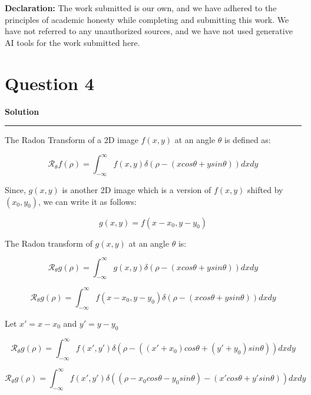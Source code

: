 \documentclass[a4paper,12pt]{article}
\title{\cooltitle{CS754 Assignment-3}}
\author{{\bf Saksham Rathi, Ekansh Ravi Shankar, Kshitij Vaidya}}
\date{}
\newenvironment{solution}[2][]{%
    \begin{mdframed}[linecolor=blue!70!black, linewidth=2pt, roundcorner=10pt, backgroundcolor=yellow!10!white, skipabove=12pt, skipbelow=12pt]%
        \textbf{\large #2}
        \par\noindent\rule{\textwidth}{0.4pt}
}{
    \end{mdframed}
}
\begin{document}
\maketitle
\textbf{Declaration:} The work submitted is our own, and
we have adhered to the principles of academic honesty while completing and submitting this work. We have not referred to any unauthorized sources, and we have not used generative AI tools for the work submitted here.

\section*{Question 4}

\begin{solution}{Solution}
 The Radon Transform of a 2D image $f(x, y)$ at an angle $\theta$ is defined as:

 \begin{equation}
  \mathcal{R}_\theta f(\rho) = \int_{-\infty}^{\infty}f(x, y)\delta(\rho - (x cos\theta + y sin\theta)) dx dy
  \label{eq1}
 \end{equation}

 Since, $g(x, y)$ is another 2D image which is a version of $f(x, y)$ shifted by $(x_0, y_0)$, we can write it as follows:

 \[g(x, y) = f(x - x_0, y - y_0)\]

 The Radon transform of $g(x, y)$ at an angle $\theta$ is:

 \begin{equation}
  \mathcal{R}_\theta g(\rho) = \int_{-\infty}^{\infty}g(x, y)\delta(\rho - (x cos\theta + y sin\theta)) dx dy 
 \end{equation}

 \begin{equation}
  \mathcal{R}_\theta g(\rho)  = \int_{-\infty}^{\infty}f(x - x_0, y - y_0)\delta(\rho - (x cos\theta + y sin\theta)) dx dy
 \end{equation}

 Let $x' = x - x_0$ and $y' = y - y_0$ 

 \begin{equation}
  \mathcal{R}_\theta g(\rho)  = \int_{-\infty}^{\infty}f(x', y')\delta(\rho - ((x' + x_0) cos\theta + (y' + y_0) sin\theta)) dx dy
 \end{equation}

 \begin{equation}
  \mathcal{R}_\theta g(\rho)  = \int_{-\infty}^{\infty}f(x', y')\delta((\rho - x_0 cos\theta - y_0 sin\theta)- (x' cos\theta + y' sin\theta)) dx dy
 \end{equation}


\end{solution}
\end{document}
